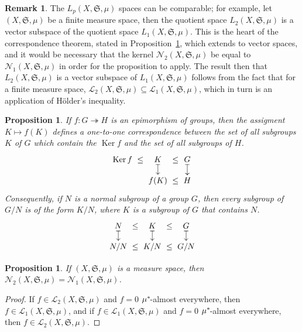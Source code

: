\documentclass[
twoside=true,
paper=letter,
fontsize=9pt,
pagesize=auto,
leqno,
openany,
headsepline,
overfullrule,
]{scrbook}
\theoremstyle{plain}
\theoremstyle{plain}
\newtheorem{prop}[thm]{Proposition}
\theoremstyle{definition}
\newtheorem{rmk}[thm]{Remark}
\theoremstyle{bfnoteitalic}
\theoremstyle{bfnoteroman}
\newcommand{\sigalg}[1]{\mathfrak{#1}}
\newcommand{\cali}[1]{\mathscr{#1}}
\DeclareMathOperator{\kernel}{Ker}
\newcommand{\semiring}{\sigalg{S}}
\newcommand{\kernast}{\ast\kern-1pt}
\newcommand{\measurespace}{X}
\newcommand{\measure}{\mu}
\begin{document}
\begin{rmk}
The $L_p(\measurespace, \semiring, \measure)$ spaces can be comparable; for example, let
$(\measurespace, \semiring, \measure)$ be a finite measure space, then the quotient space $L_2(\measurespace, \semiring, \measure)$ is a vector subspace of the quotient space
$L_1(\measurespace, \semiring, \measure)$. This is the heart of the correspondence theorem, stated in Proposition~\ref{correspondence_theorem},  which extends to vector spaces, and it would be necessary that the kernel
$\cali{N}_2(\measurespace, \semiring, \measure)$
be equal to
$\cali{N}_1(\measurespace, \semiring, \measure)$
in order for the proposition to apply.
The result then that 
$L_2(\measurespace, \semiring, \measure)$ is a vector subspace of
$L_1(\measurespace, \semiring, \measure)$ follows from the fact that for a finite measure space, 
$\cali{L}_2(\measurespace, \semiring, \measure)
\subseteq
\cali{L}_1(\measurespace, \semiring, \measure)$, which in turn is an application of H\"older's inequality.
\end{rmk}


\begin{prop}\label{correspondence_theorem}
If $f:G\twoheadrightarrow H$ is an epimorphism of groups, then the assigment $K\mapsto f(K)$ defines a one-to-one correspondence between the set of all subgroups $K$ of $G$ which contain the $\kernel f$ and the set of all subgroups of $H$. 
\[
\xymatrix@R=10pt@C=0pt{ 
\kernel f  & \leq  & K \ar@{|->}[d] & \leq & G \ar@{|->}[d]\\
 &  & f(K) & \leq & H\\
}
\]
Consequently, if $N$ is a normal subgroup of a group $G$, then every subgroup of $G/N$ is of the form $K/N$, where $K$ is a subgroup of $G$ that contains $N$. 
\[
\xymatrix@R=10pt@C=0pt{ 
N \ar@{|->}[d] & \leq  & K \ar@{|->}[d] & \leq & G \ar@{|->}[d]\\
N/N & \leq & K/N & \leq & G/N\\
}
\]
\end{prop}



\begin{prop}
If $(\measurespace, \semiring, \measure)$ is a measure space, then
$\cali{N}_2(\measurespace, \semiring, \measure) = \cali{N}_1(\measurespace, \semiring, \measure)$.
\end{prop}

\begin{proof}
If 
$f\in \cali{L}_2(\measurespace, \semiring, \measure)$ and $f=0$ $\measure^\kernast$-almost everywhere, then $f\in \cali{L}_1(\measurespace, \semiring, \measure)$, and if 
$f\in \cali{L}_1(\measurespace, \semiring, \measure)$ and $f=0$ $\measure^\kernast$-almost everywhere, then $f\in \cali{L}_2(\measurespace, \semiring, \measure)$.
\end{proof}
\end{document}
